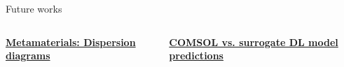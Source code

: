 \documentclass[10pt,aspectratio=169,dvipsnames]{beamer} %
\begin{document}
	\begin{frame}{Future works}
		\begin{columns}[T]
			\begin{column}[t]{0.49\textwidth}
				\centering
				\textbf{\underline{Metamaterials: Dispersion diagrams}}
				\begin{figure}
					\centering
				\end{figure}
			\end{column}
			\begin{column}[t]{0.49\textwidth}
				\centering
				\textbf{\underline{COMSOL vs. surrogate DL model predictions}}
				\begin{figure}
					\centering
				\end{figure}			
			\end{column}		
		\end{columns}				
	\end{frame}	
	\note{}		
\end{document}
